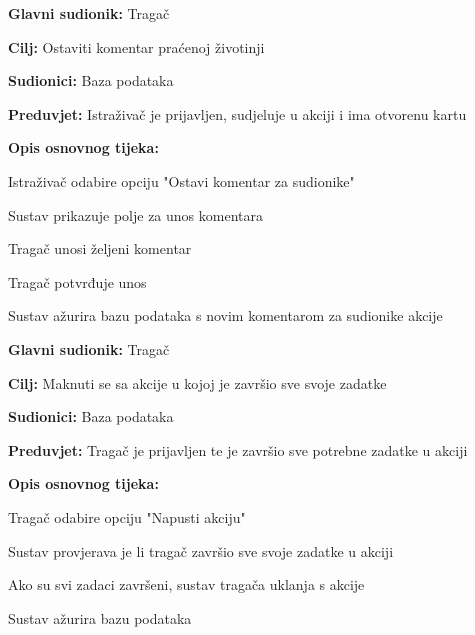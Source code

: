 					\noindent {}
					\begin{packed_item}
						
						\item \textbf{Glavni sudionik: }Tragač
						\item  \textbf{Cilj:} Ostaviti komentar praćenoj životinji 
						\item  \textbf{Sudionici:} Baza podataka
						\item  \textbf{Preduvjet:} Istraživač je prijavljen, sudjeluje u akciji i ima otvorenu kartu
						\item  \textbf{Opis osnovnog tijeka:}
						
						\item[] \begin{packed_enum}
							
							\item Istraživač odabire opciju "Ostavi komentar za sudionike" 
							\item Sustav prikazuje polje za unos komentara 
							\item Tragač unosi željeni komentar 
							\item Tragač potvrđuje unos 
							\item Sustav ažurira bazu podataka s novim komentarom za sudionike akcije 
						\end{packed_enum}
					\end{packed_item}
					
					\noindent \underbar{\textbf{UC12 -Micanje s akcije}}
					\begin{packed_item}
						
						\item \textbf{Glavni sudionik: }Tragač
						\item  \textbf{Cilj:} Maknuti se sa akcije u kojoj je završio sve svoje zadatke 
						\item  \textbf{Sudionici:} Baza podataka
						\item  \textbf{Preduvjet:} Tragač je prijavljen te je završio sve potrebne zadatke u akciji 
						\item  \textbf{Opis osnovnog tijeka:}
						
						\item[] \begin{packed_enum}
							
							\item Tragač odabire opciju "Napusti akciju" 
							\item Sustav provjerava je li tragač završio sve svoje zadatke u akciji 
							\item Ako su svi zadaci završeni, sustav tragača uklanja s akcije 
							\item Sustav ažurira bazu podataka 
						\end{packed_enum}
					\end{packed_item}
					

